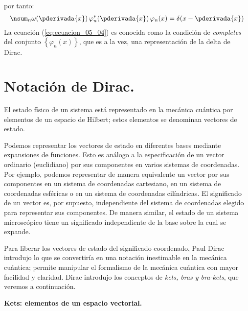 por tanto:
\begin{align}
\nsum_{n} \omega (\pderivada{x}) \, \varphi_{n}^{*} (\pderivada{x}) \, \varphi_{n} (x) = \delta(x - \pderivada{x})
\label{eq:ecuacion_05_04}
\end{align}
La ecuación (\ref{eq:ecuacion_05_04}) es conocida como la condición de \emph{completes} del conjunto $\left\{ \varphi_{n} (x) \right\}$, que es a la vez, una representación de la delta de Dirac.
\newpage
\section{Notación de Dirac.}

El estado físico de un sistema está representado en la mecánica cuántica por elementos de un espacio de Hilbert; estos elementos se denominan vectores de estado. 
\par
Podemos representar los vectores de estado en diferentes bases mediante expansiones de funciones. Esto es análogo a la especificación de un vector ordinario (euclidiano) por sus componentes en varios sistemas de coordenadas. Por ejemplo, podemos representar de manera equivalente un vector por sus componentes en un sistema de coordenadas cartesiano, en un sistema de coordenadas esféricas o en un sistema de coordenadas cilíndricas. El significado de un vector es, por supuesto, independiente del sistema de coordenadas elegido para representar sus componentes. De manera similar, el estado de un sistema microscópico tiene un significado independiente de la base sobre la cual se expande.
\par
Para liberar los vectores de estado del significado coordenado, Paul Dirac introdujo lo que se convertiría en una notación inestimable en la mecánica cuántica; permite manipular el formalismo de la mecánica cuántica con mayor facilidad y claridad. Dirac introdujo los conceptos de \emph{kets, bras y bra-kets}, que veremos a continuación.
\par
\textbf{Kets: elementos de un espacio vectorial.}

